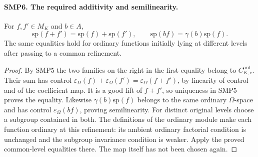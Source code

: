 \paragraph{SMP6. The required additivity and semilinearity.}
\label{claim:SMP6}
For $f,f'\in M_K$ and $b\in A$,
\[
 \mathrm{sp}(f+f')=\mathrm{sp}(f)+\mathrm{sp}(f'),
 \qquad
 \mathrm{sp}(bf)=\gamma(b)\mathrm{sp}(f).
\]
The same equalities hold for ordinary functions initially
lying at different levels after passing to a common
refinement.
\begin{proof}
By SMP5 the two families on the right in the first
equality belong to $C^{\mathrm{ord}}_{K,c}$.
Their sum has control
$\varepsilon_\Omega(f)+\varepsilon_\Omega(f')
=\varepsilon_\Omega(f+f')$, by linearity of control
and of the coefficient map.  It is a good lift of
$f+f'$, so uniqueness in SMP5 proves the equality.
Likewise $\gamma(b)\mathrm{sp}(f)$ belongs to the same
ordinary $\Omega$-space and has control
$\varepsilon_\Omega(bf)$, proving semilinearity.
For distinct original levels choose a subgroup contained
in both.  The definitions of the ordinary module make
each function ordinary at this refinement: its ambient
ordinary factorial condition is unchanged and the
subgroup invariance condition is weaker.  Apply the
proved common-level equalities there.  The map itself
has not been chosen again.
\end{proof}

